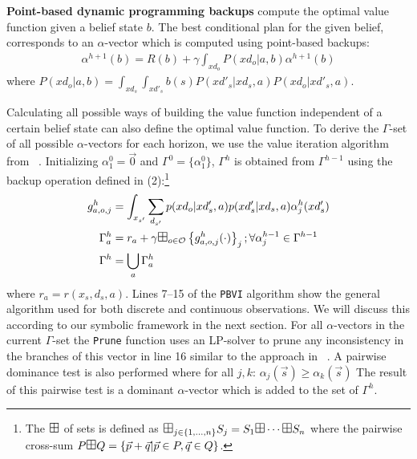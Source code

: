 \documentclass{article} %
\begin{document}
\textbf{Point-based dynamic programming backups} compute the optimal value function given a belief state $b$. The best conditional plan for the given belief, corresponds to an $\alpha$-vector which is computed using point-based backups: 
{\footnotesize
\begin{align*}
\alpha^{h+1}(b) = R(b) + \gamma \int_{xd_o} P(xd_o|a,b)\alpha^{h+1}(b)\nonumber
\end{align*}
}
where $P(xd_o|a,b) = \int_{xd_s}\int_{xd'_s}b(s)P(xd'_s|xd_s,a)P(xd_o|xd'_s,a)$.

Calculating all possible ways of building the value function independent of a certain belief state can also define the optimal value function. To derive the $\Gamma$-set of all possible $\alpha$-vectors for each horizon, we use the value iteration algorithm from ~\cite{monahan82}. Initializing  $\alpha^0_1 = \vec{0}$ and $\Gamma^0 = \{ \alpha^0_1 \}$, $\Gamma^h$ is obtained from $\Gamma^{h-1}$ using the backup operation defined in (2):\footnote{The $\textrm{\large $\boxplus$}$ of sets is defined as 
$\textrm{\large $\boxplus$}_{j \in \{ 1,\ldots, n \} } S_j = S_1 \textrm{\large $\boxplus$} \cdots \textrm{\large $\boxplus$} S_n$ where the pairwise cross-sum $P 
\textrm{\large $\boxplus$} Q = \{ \vec{p} + \vec{q} | \vec{p} \in P, \vec{q} \in Q \}$.}
{\footnotesize
\begin{align}
g^h_{a,o,j} &=  \int_{x_{s'}} \sum_{d_{s'}} p(xd_o|xd'_s,a)p(xd'_s|xd_s,a) \alpha^h_j(xd'_s) \\
\Gamma^{h}_a   &= r_a + \gamma \textrm{\large $\boxplus$}_{o \in \mathcal{O}} \left\{ g^h_{a,o,j}(\cdot) \right\}_j ;  \forall \alpha^{h-1}_{j} \in \Gamma^{h-1}  \\
\Gamma^h  &= \bigcup_a \Gamma^h_a 
\end{align}
}
where $r_a = r(x_s,d_s,a)$.  
Lines 7--15 of the \texttt{PBVI} algorithm show the general algorithm used for both discrete and continuous observations. We will discuss this according to our symbolic framework in the next section. 
For all $\alpha$-vectors in the current $\Gamma$-set the \texttt{Prune} function uses an LP-solver to prune any inconsistency in the branches of this vector in line 16 similar to the approach in ~\cite{penberthy94}. A pairwise dominance test is also performed where for all $j,k$: $\alpha_j(\vec{s}) \geq \alpha_k(\vec{s})$
The result of this pairwise test is a dominant $\alpha$-vector which is added to the set of $\Gamma^h$. 
\end{document}
